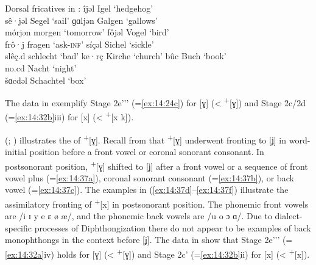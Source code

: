 \ea\label{ex:14:36} Dorsal fricatives in :
\ea\label{ex:14:36a} îjəl \tab [iːʝəl] \tab Igel \tab ‘hedgehog’ \\
    sê·jəl \tab [seːʝəl] \tab Segel \tab ‘sail’ 
\ex\label{ex:14:36b} ɡɑljən \tab [gɑlʝən] \tab Galgen \tab ‘gallows’ \\
    mórjən \tab [mɔʀʝə] \tab morgen \tab ‘tomorrow’ 
\ex\label{ex:14:36c} fôjəl \tab [foːʝəl] \tab Vogel \tab ‘bird’ \\
    frô·j \tab [fʀoːʝ] \tab fragen \tab ‘ask\textsc{{}-inf}’ 
\ex\label{ex:14:36d} síçəl \tab [sɪçəl] \tab Sichel \tab ‘sickle’ \\
    slêç.d \tab [sleːçt] \tab schlecht \tab ‘bad’ 
\ex\label{ex:14:36e} ke·rç \tab [kerç] \tab Kirche \tab ‘church’ 
\ex\label{ex:14:36f} bûc \tab [buːx] \tab Buch \tab ‘book’ \\
    no.cd \tab [nɔxt] \tab Nacht \tab ‘night’ \\
    šɑcdəl \tab [ʃɑxtəl] \tab Schachtel \tab ‘box’ 
    \z
\z 

The data in  exemplify Stage 2e'{}'{}' (=\ref{ex:14:24c}) for [ɣ] (< \textsuperscript{+}[ɣ]) and Stage 2c/2d (=\ref{ex:14:32b}iii) for [x] (< \textsuperscript{+}[x k]).

 (\citealt{Beisenherz1907}; ) illustrates the  of  \textsuperscript{+}[ɣ]. Recall from  that  \textsuperscript{+}[ɣ] underwent fronting to [ʝ] in word-initial position before a front vowel or coronal sonorant consonant. In postsonorant position,  \textsuperscript{+}[ɣ] shifted to [ʝ] after a front vowel or a sequence of front vowel plus  (=\ref{ex:14:37a}), coronal sonorant consonant (=\ref{ex:14:37b}), or back vowel (=\ref{ex:14:37c}). The examples in (\ref{ex:14:37d}--\ref{ex:14:37f}) illustrate the assimilatory fronting of  \textsuperscript{+}[x] in postsonorant position. The phonemic front vowels are /i ɪ y e ɛ ø æ/, and the phonemic back vowels are /u o ɔ ɑ/. Due to dialect-specific processes of Diphthongization there do not appear to be examples of back monophthongs in the context before [ʝ]. The data in  show that Stage 2e'{}'{}' (=\ref{ex:14:32a}iv) holds for [ɣ] (< \textsuperscript{+}[ɣ]) and Stage 2c' (=\ref{ex:14:32b}ii) for [x] (< \textsuperscript{+}[x]).

